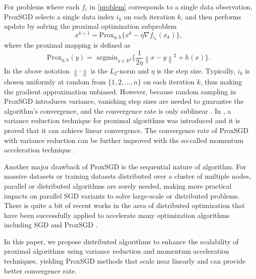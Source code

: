 \documentclass[letterpaper]{article} %
\newcommand*{\R}{\mathbb{R}}
\newcommand*{\Po}{\text{Prox}}
\newcommand{\norm}[1]{\left\lVert#1\right\rVert}
\begin{document}
For problems where each $f_i$ in \eqref{problem} corresponds to a single data observation, ProxSGD selects a single data index $i_k$ on each iteration $k$, and then performs update by solving the proximal optimization subproblem
\[
x^{k+1} = \Po_{\eta, h}\{x^{k} -\eta \nabla f_{i_k} (x_k)\},
\]
where the proximal mapping is defined as 
\[
\Po_{\eta,h}(y) = \displaystyle{\text{ argmin}}_{x\in\R^d}\{\frac{1}{2\eta}\norm{x-y}^2+h(x)\}.
\]
In the above notation $\norm{\cdot}$ is the $L_2$-norm and $\eta$ is the step size.
Typically, $i_k$ is chosen uniformly at random from $\{1, 2,\ldots, n\}$ on each iteration $k$, thus making the gradient approximation unbiased. However, because random sampling in ProxSGD introduces variance, vanishing step sizes are needed to guarantee the algorithm's convergence,
and the convergence rate is only sublinear \cite{Langford2009,rakhlin2012making}. In \cite{Xiao2014}, a variance reduction technique for proximal algorithms was introduced and it is proved that it can achieve linear convergence. The convergence rate of ProxSGD with variance reduction can be further improved with the so-called momentum acceleration technique \cite{Allen-Zhu17}.

Another major drawback of ProxSGD is the sequential nature of algorithm. For massive datasets or training datasets distributed over a cluster of multiple nodes, parallel or distributed algorithms are sorely needed, making more practical impacts on parallel SGD variants to solve large-scale or distributed problems. There is quite a bit of recent works in the area of distributed optimization that have been successfully applied to accelerate many optimization algorithms including SGD \cite{Agarwal2014,Recht2011,Mania2017} and ProxSGD \cite{LiP2016,Meng2017}.   

In this paper, we propose distributed algorithms to enhance the scalability of proximal algorithms using variance reduction and momentum acceleration techniques, yielding ProxSGD methods that scale near linearly and can provide better convergence rate.
\end{document}
